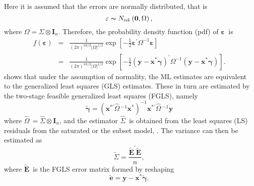 Here it is assumed that the errors are normally distributed, that
is
\[
\mathbf{\varepsilon}\thicksim N_{nk}\left(\mathbf{0},\Omega\right),
\]
where $\Omega=\Sigma\otimes\mathbf{I}_{n}$. Therefore, the probability
density function (pdf) of $\mathbf{\varepsilon}$\ is
\begin{eqnarray}
f\left(\mathbf{\varepsilon}\right) & = & \frac{1}{\left(2\pi\right)^{nk/2}\left\vert \Omega\right\vert ^{1/2}}\exp\left[-\frac{1}{2}\mathbf{\varepsilon}^{\prime}\Omega^{-1}\mathbf{\varepsilon}\right]\nonumber \\
 & = & \frac{1}{\left(2\pi\right)^{nk/2}\left\vert \Omega\right\vert ^{1/2}}\exp\left[-\frac{1}{2}\left(\mathbf{y}-\mathbf{x}^{\ast}\mathbf{\gamma}\right)^{\prime}\Omega^{-1}\left(\mathbf{y}-\mathbf{x}^{\ast}\mathbf{\gamma}\right)\right].\label{MVN pdf}
\end{eqnarray}
\citet[Chap.~5.2]{Luetk:1993} shows that under the assumption of
normality, the ML estimates are equivalent to the generalized least
squares (GLS) estimates. These in turn are estimated by the two-stage
feasible generalized least squares (FGLS), namely
\begin{equation}
\widetilde{\mathbf{\gamma}}=\left(\mathbf{x}^{\ast\prime}\widehat{\Omega}\,^{-1}\mathbf{x}^{\ast}\right)^{-1}\mathbf{x}^{\ast\prime}\widehat{\Omega}\,^{-1}\mathbf{y}\label{2S-FGLS Regression Parameters(Gaussian)}
\end{equation}
where $\widehat{\Omega}\,=\widehat{\Sigma}\otimes\mathbf{I}_{n}$,
and the estimator $\widehat{\Sigma}$\ is obtained from the least
squares (LS) residuals from the saturated or the subset model, \citet{Hamil:1994}.
The variance can then be estimated as
\begin{equation}
\widetilde{\Sigma}=\frac{\widetilde{\mathbf{E}}^{\prime}\widetilde{\mathbf{E}}}{n},\label{2S-FGLS Variance (Gaussian)}
\end{equation}
where $\widetilde{\mathbf{E}}$\ is the FGLS error matrix formed
by reshaping
\[
\widetilde{\mathbf{e}}=\mathbf{y}-\mathbf{x}^{\ast}\widetilde{\mathbf{\gamma}}.
\]


